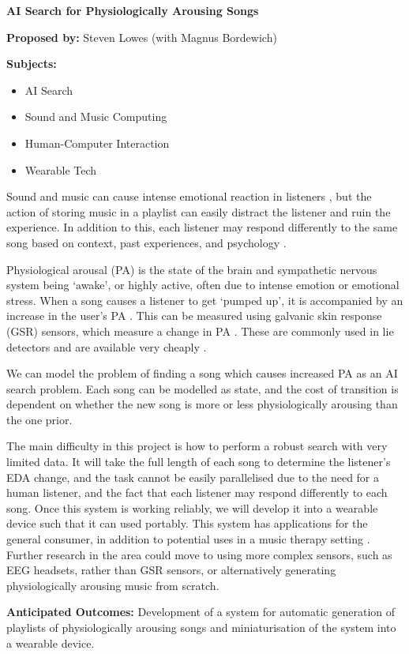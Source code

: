 \documentclass[a4paper,12pt]{article}
\begin{document}
	\begin{center}
		\Huge \textbf{AI Search for Physiologically Arousing Songs}
	\end{center}

	\textbf{Proposed by:} Steven Lowes (with Magnus Bordewich)
	
	\textbf{Subjects:}
	\begin{itemize}
		\item AI Search
		\item Sound and Music Computing
		\item Human-Computer Interaction
		\item Wearable Tech
	\end{itemize}

	Sound and music can cause intense emotional reaction in listeners \citep{arousingMusic}, but the action of storing music in a playlist can easily distract the listener and ruin the experience. In addition to this, each listener may respond differently to the same song based on context, past experiences, and psychology \citep{musicDifferences}.
	
	Physiological arousal (PA) is the state of the brain and sympathetic nervous system being `awake', or highly active, often due to intense emotion or emotional stress. When a song causes a listener to get `pumped up', it is accompanied by an increase in the user's PA \citep{pumpedUp}. This can be measured using galvanic skin response (GSR) sensors, which measure a change in PA \citep{GSR}. These are commonly used in lie detectors and are available very cheaply \citep{gsrSensor}.
	
	We can model the problem of finding a song which causes increased PA as an AI search problem. Each song can be modelled as state, and the cost of transition is dependent on whether the new song is more or less physiologically arousing than the one prior.
	
	The main difficulty in this project is how to perform a robust search with very limited data. It will take the full length of each song to determine the listener's EDA change, and the task cannot be easily parallelised due to the need for a human listener, and the fact that each listener may respond differently to each song.
	\newpage
	Once this system is working reliably, we will develop it into a wearable device such that it can used portably. This system has applications for the general consumer, in addition to potential uses in a music therapy setting \citep{musicTherapy}. Further research in the area could move to using more complex sensors, such as EEG headsets, rather than GSR sensors, or alternatively generating physiologically arousing music from scratch.
	
	\textbf{Anticipated Outcomes:} Development of a system for automatic generation of playlists of physiologically arousing songs and miniaturisation of the system into a wearable device.
	
	
\end{document}

